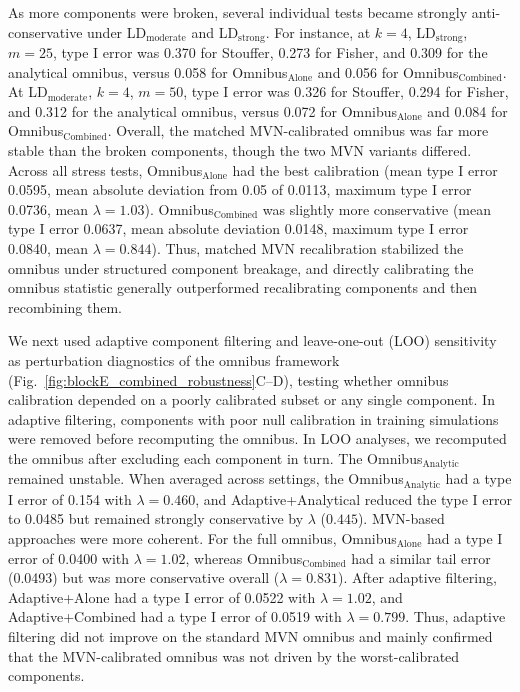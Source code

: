 \documentclass[unnumsec,webpdf,contemporary,large]{oup-authoring-template}%
\theoremstyle{thmstyleone}%
\theoremstyle{thmstyletwo}%
\theoremstyle{thmstylethree}%
\begin{document}
As more components were broken, several individual tests became strongly anti-conservative under LD\(_\text{moderate}\) and LD\(_\text{strong}\). For instance, at \(k=4\), LD\(_\text{strong}\), \(m=25\), type I error was 0.370 for Stouffer, 0.273 for Fisher, and 0.309 for the analytical omnibus, versus 0.058 for Omnibus\(_\text{Alone}\) and 0.056 for Omnibus\(_\text{Combined}\). At LD\(_\text{moderate}\), \(k=4\), \(m=50\), type I error was 0.326 for Stouffer, 0.294 for Fisher, and 0.312 for the analytical omnibus, versus 0.072 for Omnibus\(_\text{Alone}\) and 0.084 for Omnibus\(_\text{Combined}\). Overall, the matched MVN-calibrated omnibus was far more stable than the broken components, though the two MVN variants differed. Across all stress tests, Omnibus\(_\text{Alone}\) had the best calibration (mean type I error 0.0595, mean absolute deviation from 0.05 of 0.0113, maximum type I error 0.0736, mean \(\lambda=1.03\)). Omnibus\(_\text{Combined}\) was slightly more conservative (mean type I error 0.0637, mean absolute deviation 0.0148, maximum type I error 0.0840, mean \(\lambda=0.844\)). Thus, matched MVN recalibration stabilized the omnibus under structured component breakage, and directly calibrating the omnibus statistic generally outperformed recalibrating components and then recombining them.

We next used adaptive component filtering and leave-one-out (LOO) sensitivity as perturbation diagnostics of the omnibus framework (Fig.~\ref{fig:blockE_combined_robustness}C--D), testing whether omnibus calibration depended on a poorly calibrated subset or any single component. In adaptive filtering, components with poor null calibration in training simulations were removed before recomputing the omnibus. In LOO analyses, we recomputed the omnibus after excluding each component in turn. The Omnibus\(_\text{Analytic}\) remained unstable. When averaged across settings, the Omnibus\(_\text{Analytic}\) had a type I error of 0.154 with \(\lambda=0.460\), and Adaptive+Analytical reduced the type I error to 0.0485 but remained strongly conservative by \(\lambda\) (\(0.445\)). MVN-based approaches were more coherent. For the full omnibus, Omnibus\(_\text{Alone}\) had a type I error of 0.0400 with \(\lambda=1.02\), whereas Omnibus\(_\text{Combined}\) had a similar tail error (0.0493) but was more conservative overall (\(\lambda=0.831\)). After adaptive filtering, Adaptive+Alone had a type I error of 0.0522 with \(\lambda=1.02\), and Adaptive+Combined had a type I error of 0.0519 with \(\lambda=0.799\). Thus, adaptive filtering did not improve on the standard MVN omnibus and mainly confirmed that the MVN-calibrated omnibus was not driven by the worst-calibrated components.
\end{document}
